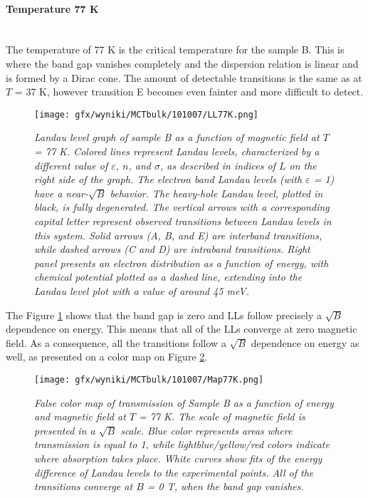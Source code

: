 \documentclass[titlepage,a4paper]{book}
\newcommand{\wciecie}{\quad\phantom{v}}
\newcommand{\myparagraph}[1]{\paragraph{#1}\mbox{}\\}
\begin{document}
\myparagraph{Temperature 77 K}
\wciecie
The temperature of 77 K is the critical temperature for the sample B. This is where the band gap vanishes completely and the dispersion relation is linear and is formed by a Dirac cone. The amount of detectable transitions is the same as at $T$ = 37 K, however transition E becomes even fainter and more difficult to detect. 
\begin{figure}[H]
	\centering
	\texttt{[image: gfx/wyniki/MCTbulk/101007/LL77K.png]}
	\vspace{-10pt}
	\caption{\textit{Landau level graph of sample B as a function of magnetic field at $T$ = 77 K. Colored lines represent Landau levels, characterized by a different value of $\varepsilon$, $n$, and $\sigma$, as described in indices of $L$ on the right side of the graph. The electron band Landau levels (with $\varepsilon$ = 1) have a near-$\sqrt{B}$ behavior. The heavy-hole Landau level, plotted in black, is fully degenerated. The vertical arrows with a corresponding capital letter represent observed transitions between Landau levels in this system. Solid arrows (A, B, and E) are interband transitions, while dashed arrows (C and D) are intraband transitions. Right panel presents an electron distribution as a function of energy, with chemical potential plotted as a dashed line, extending into the Landau level plot with a value of around 45 meV.}}
	\label{fig:LL_101007_77K}
\end{figure}

The Figure \ref{fig:LL_101007_77K} shows that the band gap is zero and LLs follow precisely a $\sqrt{B}$ dependence on energy. This means that all of the LLs converge at zero magnetic field. As a consequence, all the transitions follow a $\sqrt{B}$ dependence on energy as well, as presented on a color map on Figure \ref{fig:Map_101007_77K}. 

\begin{figure}[ht]
	\centering
	\texttt{[image: gfx/wyniki/MCTbulk/101007/Map77K.png]}
	\vspace{-10pt}
	\caption{\textit{False color map of transmission of Sample B as a function of energy and magnetic field at $T$ = 77 K. The scale of magnetic field is presented in a $\sqrt{B}$ scale. Blue color represents areas where transmission is equal to 1, while lightblue/yellow/red colors indicate where absorption takes place. White curves show fits of the energy difference of Landau levels to the experimental points. All of the transitions converge at $B$ = 0 T, when the band gap vanishes.}}
	\label{fig:Map_101007_77K}
\end{figure} 
\end{document}
